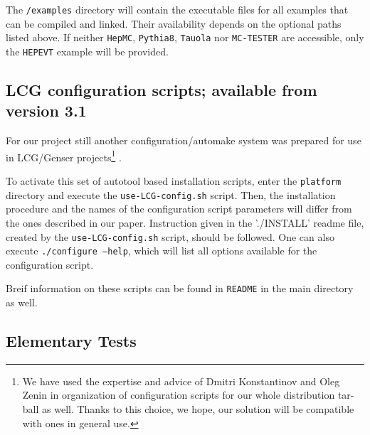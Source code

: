 \documentclass[]{Photos_interface_design}
\begin{document}
The {\tt /examples} directory will
contain the executable files for all examples that can be compiled and linked.
Their availability depends on the optional paths listed above.
If neither {\tt HepMC}, {\tt Pythia8}, {\tt Tauola} nor {\tt MC-TESTER} are accessible, 
only the {\tt HEPEVT} example will be provided.

\subsection{ LCG configuration scripts; available from version 3.1%
}
\label{sec:autotools}
For our project still another configuration/automake system was prepared
for use in LCG/Genser projects\footnote{We have used the expertise and advice
of Dmitri Konstantinov and Oleg Zenin in organization of configuration scripts
for our whole distribution tar-ball as well. Thanks to this choice, we hope, our solution
 will be compatible with ones in general use.} \cite{LCG,Kirsanov:2008zz}.

To activate this set of autotool based \cite{autotools} installation scripts,
enter the {\tt platform} directory and execute the {\tt use-LCG-config.sh} script.
Then, the installation procedure and the names of the configuration script parameters will differ from the ones 
described in our paper. Instruction given in the  './INSTALL' readme file, created by the {\tt use-LCG-config.sh} script,
should be followed. One can also execute {\tt ./configure --help}, which will 
list all options available for the configuration script.

Breif information on these scripts can be found in {\tt README} in the main directory as well.

\subsection{Elementary Tests}
\label{sect:elem}
\end{document}
